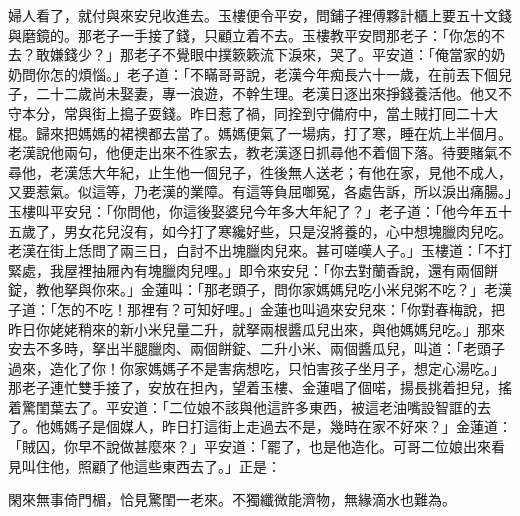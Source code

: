 婦人看了，就付與來安兒收進去。玉樓便令平安，問鋪子裡傅夥計櫃上要五十文錢與磨鏡的。那老子一手接了錢，只顧立着不去。玉樓教平安問那老子：「你怎的不去？敢嫌錢少？」那老子不覺眼中撲簌簌流下淚來，哭了。平安道：「俺當家的奶奶問你怎的煩惱。」老子道：「不瞞哥哥說，老漢今年痴長六十一歲，在前丟下個兒子，二十二歲尚未娶妻，專一浪遊，不幹生理。老漢日逐出來掙錢養活他。他又不守本分，常與街上搗子耍錢。昨日惹了禍，同拴到守備府中，當土賊打囘二十大棍。歸來把媽媽的裙襖都去當了。媽媽便氣了一場病，打了寒，睡在炕上半個月。老漢說他兩句，他便走出來不徃家去，教老漢逐日抓尋他不着個下落。待要賭氣不尋他，老漢恁大年紀，止生他一個兒子，徃後無人送老；有他在家，見他不成人，又要惹氣。似這等，乃老漢的業障。有這等負屈啣冤，各處告訴，所以淚出痛腸。」玉樓叫平安兒：「你問他，你這後娶婆兒今年多大年紀了？」老子道：「他今年五十五歲了，男女花兒沒有，如今打了寒纔好些，只是沒將養的，心中想塊臘肉兒吃。老漢在街上恁問了兩三日，白討不出塊臘肉兒來。甚可嗟嘆人子。」玉樓道：「不打緊處，我屋裡抽屜內有塊臘肉兒哩。」即令來安兒：「你去對蘭香說，還有兩個餅錠，教他拏與你來。」金蓮叫：「那老頭子，問你家媽媽兒吃小米兒粥不吃？」老漢子道：「怎的不吃！那裡有？可知好哩。」金蓮也叫過來安兒來：「你對春梅說，把昨日你姥姥稍來的新小米兒量二升，就拏兩根醬瓜兒出來，與他媽媽兒吃。」那來安去不多時，拏出半腿臘肉、兩個餅錠、二升小米、兩個醬瓜兒，叫道：「老頭子過來，造化了你！你家媽媽子不是害病想吃，只怕害孩子坐月子，想定心湯吃。」那老子連忙雙手接了，安放在担內，望着玉樓、金蓮唱了個喏，揚長挑着担兒，搖着驚閨葉去了。平安道：「二位娘不該與他這許多東西，被這老油嘴設智誆的去了。他媽媽子是個媒人，昨日打這街上走過去不是，幾時在家不好來？」金蓮道：「賊囚，你早不說做甚麼來？」平安道：「罷了，也是他造化。可哥二位娘出來看見叫住他，照顧了他這些東西去了。」正是：

閑來無事倚門楣，恰見驚閨一老來。不獨纖微能濟物，無緣滴水也難為。

